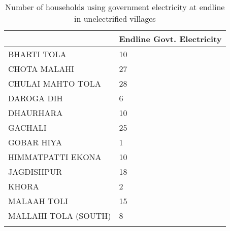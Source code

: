 \begin{table}[h] \centering%
\caption{Number of households using government electricity at endline in unelectrified villages}%
\begin{tabularx}{\textwidth}{lC}
\toprule
&Endline Govt. Electricity \tabularnewline
\midrule\addlinespace[1.5ex]
BHARTI TOLA&10 \tabularnewline
CHOTA MALAHI&27 \tabularnewline
CHULAI MAHTO TOLA&28 \tabularnewline
DAROGA DIH&6 \tabularnewline
DHAURHARA&10 \tabularnewline
GACHALI&25 \tabularnewline
GOBAR HIYA&1 \tabularnewline
HIMMATPATTI EKONA&10 \tabularnewline
JAGDISHPUR&18 \tabularnewline
KHORA&2 \tabularnewline
MALAAH TOLI&15 \tabularnewline
MALLAHI TOLA (SOUTH)&8 \tabularnewline
\bottomrule \addlinespace[1.5ex]
\end{tabularx}%
\end{table}%
